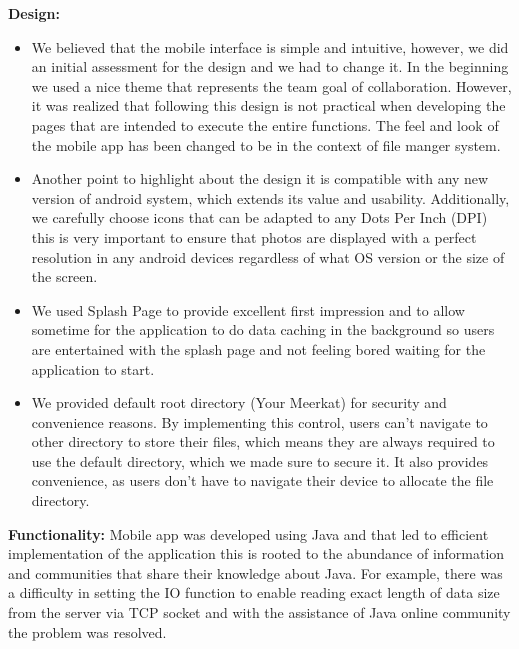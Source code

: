 \documentclass{article}
\begin{document}
\textbf{Design:}
\begin{itemize}
\item We believed that the mobile interface is simple and intuitive, however, we did an initial assessment for the design and we had to change it. In the beginning we used a nice theme that represents the team goal of collaboration. However, it was realized that following this design is not practical when developing the pages that are intended to execute the entire functions. The feel and look of the mobile app has been changed to be in the context of file manger system.
\item Another point to highlight about the design it is compatible with any new version of android system, which extends its value and usability. Additionally, we carefully choose icons that can be adapted to any Dots Per Inch (DPI) this is very important to ensure that photos are displayed with a perfect resolution in any android devices regardless of what OS version or the size of the screen.
\item We used Splash Page to provide excellent first impression and to allow sometime for the application to do data caching in the background so users are entertained with the splash page and not feeling bored waiting for the application to start.
\item We provided default root directory (Your Meerkat) for security and convenience reasons. By implementing this control, users can’t navigate to other directory to store their files, which means they are always required to use the default directory, which we made sure to secure it. It also provides convenience, as users don’t have to navigate their device to allocate the file directory.
\end{itemize}

\textbf{Functionality:}
Mobile app was developed using Java and that led to efficient implementation of the application this is rooted to the abundance of information and communities that share their knowledge about Java. For example, there was a difficulty in setting the IO function to enable reading exact length of data size from the server via TCP socket and with the assistance of Java online community the problem was resolved.
\end{document}
